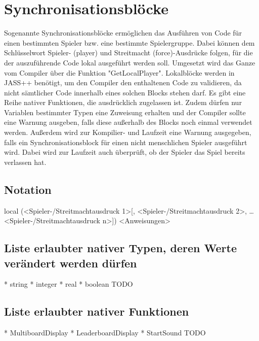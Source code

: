 \chapter{Synchronisationsblöcke}
Sogenannte Synchronisationsblöcke ermöglichen das Ausführen von Code für einen bestimmten Spieler bzw. eine bestimmte Spielergruppe.
Dabei können dem Schlüsselwort Spieler- (player) und Streitmacht (force)-Ausdrücke folgen, für die der auszuführende Code lokal ausgeführt werden soll.
Umgesetzt wird das Ganze vom Compiler über die Funktion "GetLocalPlayer". Lokalblöcke werden in JASS++ benötigt, um den Compiler den enthaltenen Code zu validieren, da nicht sämtlicher Code innerhalb eines solchen Blocks stehen darf.
Es gibt eine Reihe nativer Funktionen, die ausdrücklich zugelassen ist.
Zudem dürfen nur Variablen bestimmter Typen eine Zuweisung erhalten und der Compiler sollte eine Warnung ausgeben, falls diese außerhalb des Blocks noch einmal verwendet werden.
Außerdem wird zur Kompilier- und Laufzeit eine Warnung ausgegeben, falls ein Synchronisationsblock für einen nicht menschlichen Spieler ausgeführt wird.
Dabei wird zur Laufzeit auch überprüft, ob der Spieler das Spiel bereits verlassen hat.

\section{Notation}
local (<Spieler-/Streitmachtausdruck 1>[, <Spieler-/Streitmachtausdruck 2>, … <Spieler-/Streitmachtausdruck n>])
{
	<Anweisungen>
}

\section{Liste erlaubter nativer Typen, deren Werte verändert werden dürfen}
* string
* integer
* real
* boolean
TODO

\section{Liste erlaubter nativer Funktionen}
* MultiboardDisplay
* LeaderboardDisplay
* StartSound
TODO 
